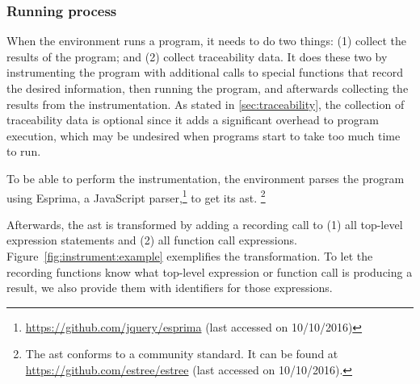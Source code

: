 %


\subsubsection{Running process}
When the environment runs a program, it needs to do two things: (1) collect the results of the program; and (2) collect traceability data.
It does these two by instrumenting the program with additional calls to special functions that record the desired information, then running the program, and afterwards collecting the results from the instrumentation.
As stated in \ref{sec:traceability}, the collection of traceability data is optional since it adds a significant overhead to program execution, which may be undesired when programs start to take too much time to run.

To be able to perform the instrumentation, the environment parses the program using Esprima, a JavaScript parser,\footnote{\url{https://github.com/jquery/esprima} (last accessed on 10/10/2016)} to get its \gls{ast}.%
\footnote{The \gls{ast} conforms to a community standard. It can be found at \url{https://github.com/estree/estree} (last accessed on 10/10/2016).}

Afterwards, the \gls{ast} is transformed by adding a recording call to (1) all top-level expression statements and (2) all function call expressions.
Figure~\ref{fig:instrument:example} exemplifies the transformation.
To let the recording functions know what top-level expression or function call is producing a result, we also provide them with identifiers for those expressions.


